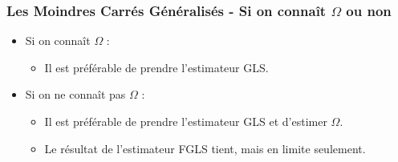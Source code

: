 \documentclass{beamer}
\begin{document}
\begin{frame}
\frametitle{Les Moindres Carrés Généralisés - Si on connaît \( \Omega \) ou non}
\begin{itemize}
    \item Si on connaît \( \Omega \) :
    \begin{itemize}
        \item Il est préférable de prendre l'estimateur GLS.
    \end{itemize}
    \item Si on ne connaît pas \( \Omega \) :
    \begin{itemize}
        \item Il est préférable de prendre l'estimateur GLS et d’estimer \( \Omega \).
        \item Le résultat de l’estimateur FGLS tient, mais en limite seulement.
    \end{itemize}
\end{itemize}
\end{frame}
\end{document}
